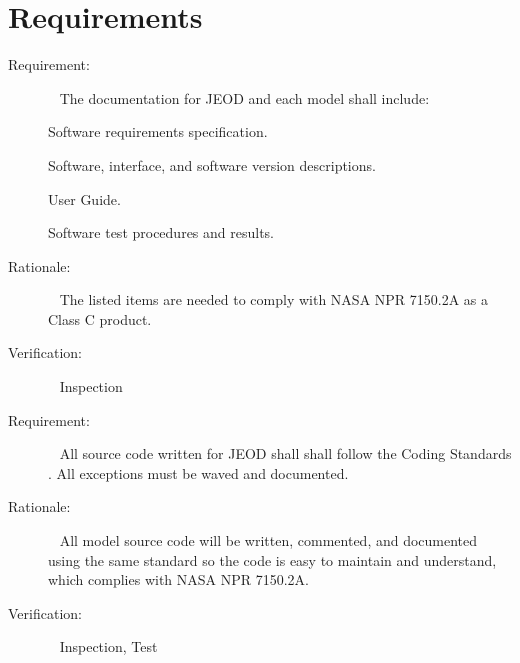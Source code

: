 %
%
%
%
% 
%

\chapter{Requirements}\label{sec:reqts}

\label{reqt:documentation}
\begin{description}
  \item[Requirement:]\ \newline
    The documentation for JEOD and each model shall include:

    \subrequirement{}
    \label{reqt:reqts_doc}
      Software requirements specification.

    \subrequirement{}
    \label{reqt:design_doc}
      Software, interface, and software version descriptions.

    \subrequirement{}
    \label{reqt:user_doc}
      User Guide.

    \subrequirement{}
    \label{reqt:test_doc}
      Software test procedures and results.

  \item[Rationale:]\ \newline
    The listed items are needed to comply with NASA NPR 7150.2A as a Class C product.

  \item[Verification:]\ \newline
    Inspection
\end{description}

\label{reqt:jeod_code}
\begin{description}
  \item[Requirement:]\ \newline
    All source code written for JEOD shall shall follow the Coding Standards \cite{dynenv:CODE_STANDARD}. All exceptions must be waved and documented.

  \item[Rationale:]\ \newline
    All model source code will be written, commented, and documented using the same standard so the code is easy to maintain and understand, which complies with NASA NPR 7150.2A.

  \item[Verification:]\ \newline
    Inspection, Test
\end{description}

